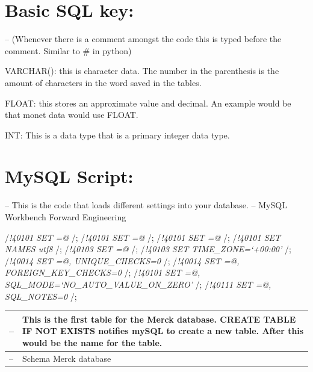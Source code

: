 \documentclass[]{book}
\begin{document}
\section{Basic SQL key:}\label{basic-sql-key}

-- (Whenever there is a comment amongst the code this is typed before
the comment. Similar to \# in python)

VARCHAR(): this is character data. The number in the parenthesis is the
amount of characters in the word saved in the tables.

FLOAT: this stores an approximate value and decimal. An example would be
that monet data would use FLOAT.

INT: This is a data type that is a primary integer data type.

\section{MySQL Script:}\label{mysql-script}

-- This is the code that loads different settings into your database. --
MySQL Workbench Forward Engineering

/\emph{!40101 SET
\citet{OLD_CHARACTER_SET_CLIENT}=@\citet{CHARACTER_SET_CLIENT} }/;
/\emph{!40101 SET
\citet{OLD_CHARACTER_SET_RESULTS}=@\citet{CHARACTER_SET_RESULTS} }/;
/\emph{!40101 SET
\citet{OLD_COLLATION_CONNECTION}=@\citet{COLLATION_CONNECTION} }/;
/\emph{!40101 SET NAMES utf8 }/; /\emph{!40103 SET
\citet{OLD_TIME_ZONE}=@\citet{TIME_ZONE} }/; /\emph{!40103 SET
TIME\_ZONE=`+00:00' }/; /\emph{!40014 SET
\citet{OLD_UNIQUE_CHECKS}=@\citet{UNIQUE_CHECKS}, UNIQUE\_CHECKS=0 }/;
/\emph{!40014 SET
\citet{OLD_FOREIGN_KEY_CHECKS}=@\citet{FOREIGN_KEY_CHECKS},
FOREIGN\_KEY\_CHECKS=0 }/; /\emph{!40101 SET
\citet{OLD_SQL_MODE}=@\citet{SQL_MODE},
SQL\_MODE=`NO\_AUTO\_VALUE\_ON\_ZERO' }/; /\emph{!40111 SET
\citet{OLD_SQL_NOTES}=@\citet{SQL_NOTES}, SQL\_NOTES=0 }/;

\begin{longtable}[]{@{}ll@{}}
\toprule
-- & This is the first table for the Merck database. CREATE TABLE IF NOT
EXISTS notifies mySQL to create a new table. After this would be the
name for the table.\tabularnewline
\midrule
\endhead
-- & Schema Merck database\tabularnewline
\bottomrule
\end{longtable}
\end{document}
